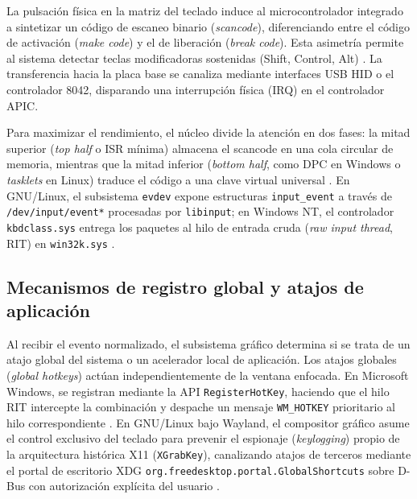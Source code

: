 \documentclass[12pt]{article}
\begin{document}
La pulsación física en la matriz del teclado induce al microcontrolador integrado a sintetizar un código de escaneo binario (\textit{scancode}), diferenciando entre el código de activación (\textit{make code}) y el de liberación (\textit{break code}). Esta asimetría permite al sistema detectar teclas modificadoras sostenidas (Shift, Control, Alt) \parencite[\S 7.8, p.\ 399]{carretero2001sistemas}. La transferencia hacia la placa base se canaliza mediante interfaces USB HID o el controlador 8042, disparando una interrupción física (IRQ) en el controlador APIC.

Para maximizar el rendimiento, el núcleo divide la atención en dos fases: la mitad superior (\textit{top half} o ISR mínima) almacena el scancode en una cola circular de memoria, mientras que la mitad inferior (\textit{bottom half}, como DPC en Windows o \textit{tasklets} en Linux) traduce el código a una clave virtual universal \parencite[\S 1.4, p.\ 40]{stallings2018operating}. En GNU/Linux, el subsistema \texttt{evdev} expone estructuras \texttt{input\_event} a través de \texttt{/dev/input/event*} procesadas por \texttt{libinput}; en Windows NT, el controlador \texttt{kbdclass.sys} entrega los paquetes al hilo de entrada cruda (\textit{raw input thread}, RIT) en \texttt{win32k.sys} \parencite{microsoftRegisterHotKey}.

\subsection{Mecanismos de registro global y atajos de aplicación}
\label{subsec:mecanismosRegistroGlobal}

Al recibir el evento normalizado, el subsistema gráfico determina si se trata de un atajo global del sistema o un acelerador local de aplicación. Los atajos globales (\textit{global hotkeys}) actúan independientemente de la ventana enfocada. En Microsoft Windows, se registran mediante la API \texttt{RegisterHotKey}, haciendo que el hilo RIT intercepte la combinación y despache un mensaje \texttt{WM\_HOTKEY} prioritario al hilo correspondiente \parencite{microsoftRegisterHotKey}. En GNU/Linux bajo Wayland, el compositor gráfico asume el control exclusivo del teclado para prevenir el espionaje (\textit{keylogging}) propio de la arquitectura histórica X11 (\texttt{XGrabKey}), canalizando atajos de terceros mediante el portal de escritorio XDG \texttt{org.freedesktop.portal.GlobalShortcuts} sobre D-Bus con autorización explícita del usuario \parencite{freedesktopGlobalShortcuts}.
\end{document}
